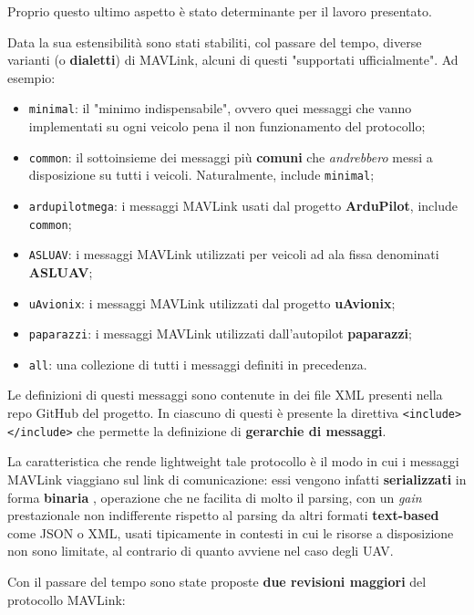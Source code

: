 \documentclass[a4paper, 12pt, oneside]{article}
\begin{document}
Proprio questo ultimo aspetto è stato determinante per il lavoro presentato.

Data la sua estensibilità sono stati stabiliti, col passare del tempo, diverse varianti (o \textbf{dialetti}) di MAVLink, alcuni di questi "supportati ufficialmente". Ad esempio:

\begin{itemize}
    \item \texttt{minimal}: il "minimo indispensabile", ovvero quei messaggi che vanno implementati su ogni veicolo pena il non funzionamento del protocollo;
    \item \texttt{common}: il sottoinsieme dei messaggi più \textbf{comuni} che \textit{andrebbero} messi a disposizione su tutti i veicoli. Naturalmente, include \texttt{minimal};
    \item \texttt{ardupilotmega}: i messaggi MAVLink usati dal progetto \textbf{ArduPilot}, include \texttt{common};
    \item \texttt{ASLUAV}: i messaggi MAVLink utilizzati per veicoli ad ala fissa denominati \textbf{ASLUAV};
    \item \texttt{uAvionix}: i messaggi MAVLink utilizzati dal progetto \textbf{uAvionix};
    \item \texttt{paparazzi}: i messaggi MAVLink utilizzati dall'autopilot \textbf{paparazzi};
    \item \texttt{all}: una collezione di tutti i messaggi definiti in precedenza.
\end{itemize}

Le definizioni di questi messaggi sono contenute in dei file XML presenti nella repo GitHub del progetto. In ciascuno di questi è presente la direttiva \texttt{<include></include>} che permette la definizione di \textbf{gerarchie di messaggi}. \cite{mavlink-message-definitions}

La caratteristica che rende lightweight tale protocollo è il modo in cui i messaggi MAVLink viaggiano sul link di comunicazione: essi vengono infatti \textbf{serializzati} in forma \textbf{binaria} \cite{mavlink-overview}, operazione che ne facilita di molto il parsing, con un \textit{gain} prestazionale non indifferente rispetto al parsing da altri formati \textbf{text-based} come JSON o XML, usati tipicamente in contesti in cui le risorse a disposizione non sono limitate, al contrario di quanto avviene nel caso degli UAV.

Con il passare del tempo sono state proposte \textbf{due revisioni maggiori} del protocollo MAVLink:
\end{document}
